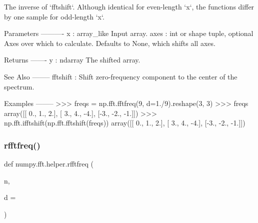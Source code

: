 \begin{DoxyVerb}The inverse of `fftshift`. Although identical for even-length `x`, the
functions differ by one sample for odd-length `x`.

Parameters
----------
x : array_like
    Input array.
axes : int or shape tuple, optional
    Axes over which to calculate.  Defaults to None, which shifts all axes.

Returns
-------
y : ndarray
    The shifted array.

See Also
--------
fftshift : Shift zero-frequency component to the center of the spectrum.

Examples
--------
>>> freqs = np.fft.fftfreq(9, d=1./9).reshape(3, 3)
>>> freqs
array([[ 0.,  1.,  2.],
       [ 3.,  4., -4.],
       [-3., -2., -1.]])
>>> np.fft.ifftshift(np.fft.fftshift(freqs))
array([[ 0.,  1.,  2.],
       [ 3.,  4., -4.],
       [-3., -2., -1.]])\end{DoxyVerb}
 \mbox{\label{namespacenumpy_1_1fft_1_1helper_a872e337cdb847c520be1ce05eb74533d}} 
\subsubsection{\texorpdfstring{rfftfreq()}{rfftfreq()}}
{\footnotesize\ttfamily def numpy.\+fft.\+helper.\+rfftfreq (\begin{DoxyParamCaption}\item[{}]{n,  }\item[{}]{d = {} }\end{DoxyParamCaption})}

